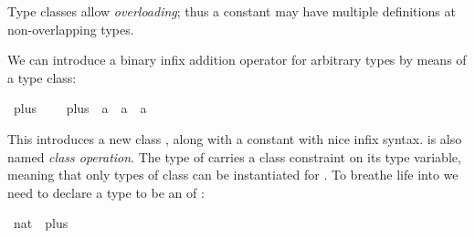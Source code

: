 %
\begin{isabellebody}%
\def\isabellecontext{Overloading}%
%
\isadelimtheory
%
\endisadelimtheory
%
\isatagtheory
%
\endisatagtheory
{\isafoldtheory}%
%
\isadelimtheory
%
\endisadelimtheory
%
\begin{isamarkuptext}%
Type classes allow \emph{overloading}; thus a constant may
have multiple definitions at non-overlapping types.%
\end{isamarkuptext}%
\isamarkuptrue%
%
\isamarkuptrue%
%
\begin{isamarkuptext}%
We can introduce a binary infix addition operator 
for arbitrary types by means of a type class:%
\end{isamarkuptext}%
\isamarkuptrue%
\isamarkupfalse%
\ plus\ {}\isanewline
\ \ \ plus\ {}{}\ {}{}a\ {}\ {}a\ {}\ {}a{}\ {}\ {}{}{}\ {}{}{}%
\begin{isamarkuptext}%
\noindent This introduces a new class ,
along with a constant  with nice infix syntax.
 is also named \emph{class operation}.  The type
of  carries a class constraint  on its type variable, meaning that only types of class
 can be instantiated for .
To breathe life into  we need to declare a type
to be an  of :%
\end{isamarkuptext}%
\isamarkuptrue%
\isamarkupfalse%
\ nat\ {}{}\ plus\isanewline
{}%
\begin{isamarkuptext}%

\end{isamarkuptext}
\end{isabellebody}
